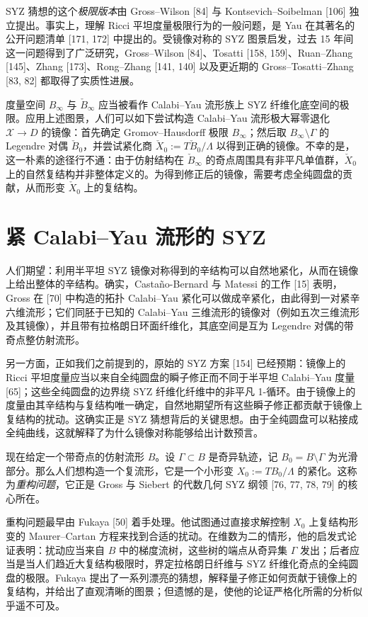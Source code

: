 SYZ 猜想的这个\emph{极限版本}由 Gross--Wilson [84] 与 Kontsevich--Soibelman [106] 独立提出。事实上，理解 Ricci 平坦度量极限行为的一般问题，是 Yau 在其著名的公开问题清单 [171, 172] 中提出的。受镜像对称的 SYZ 图景启发，过去 15 年间这一问题得到了广泛研究，Gross--Wilson [84]、Tosatti [158, 159]、Ruan--Zhang [145]、Zhang [173]、Rong--Zhang [141, 140] 以及更近期的 Gross--Tosatti--Zhang [83, 82] 都取得了实质性进展。

度量空间 $B_\infty$ 与 $\check B_\infty$ 应当被看作 Calabi--Yau 流形族上 SYZ 纤维化底空间的极限。应用上述图景，人们可以如下尝试构造 Calabi--Yau 流形极大幂零退化 $\mathcal{X} \to D$ 的镜像：首先确定 Gromov--Hausdorff 极限 $B_\infty$；然后取 $B_\infty \setminus \Gamma$ 的 Legendre 对偶 $\check B_0$，并尝试紧化商 $\check X_0 := T\check B_0/\Lambda$ 以得到正确的镜像。不幸的是，这一朴素的途径行不通：由于仿射结构在 $\check B_\infty$ 的奇点周围具有非平凡单值群，$\check X_0$ 上的自然复结构并非整体定义的。为得到修正后的镜像，需要考虑全纯圆盘的贡献，从而形变 $\check X_0$ 上的复结构。

\section{紧 Calabi--Yau 流形的 SYZ}
人们期望：利用半平坦 SYZ 镜像对称得到的辛结构可以自然地紧化，从而在镜像上给出整体的辛结构。确实，Casta\~no-Bernard 与 Matessi 的工作 [15] 表明，Gross 在 [70] 中构造的拓扑 Calabi--Yau 紧化可以做成辛紧化，由此得到一对紧辛六维流形；它们同胚于已知的 Calabi--Yau 三维流形的镜像对（例如五次三维流形及其镜像），并且带有拉格朗日环面纤维化，其底空间是互为 Legendre 对偶的带奇点整仿射流形。

另一方面，正如我们之前提到的，原始的 SYZ 方案 [154] 已经预期：镜像上的 Ricci 平坦度量应当以来自全纯圆盘的瞬子修正而不同于半平坦 Calabi--Yau 度量 [65]；这些全纯圆盘的边界绕 SYZ 纤维化纤维中的非平凡 1-循环。由于镜像上的度量由其辛结构与复结构唯一确定，自然地期望所有这些瞬子修正都贡献于镜像上复结构的扰动。这确实正是 SYZ 猜想背后的关键思想。由于全纯圆盘可以粘接成全纯曲线，这就解释了为什么镜像对称能够给出计数预言。

现在给定一个带奇点的仿射流形 $B$。设 $\Gamma \subset B$ 是奇异轨迹，记 $B_0 = B \setminus \Gamma$ 为光滑部分。那么人们想构造一个复流形，它是一个小形变 $X_0 := TB_0/\Lambda$ 的紧化。这称为\emph{重构问题}，它正是 Gross 与 Siebert 的代数几何 SYZ 纲领 [76, 77, 78, 79] 的核心所在。

重构问题最早由 Fukaya [50] 着手处理。他试图通过直接求解控制 $X_0$ 上复结构形变的 Maurer--Cartan 方程来找到合适的扰动。在维数为二的情形，他的启发式论证表明：扰动应当来自 $B$ 中的梯度流树，这些树的端点从奇异集 $\Gamma$ 发出；后者应当是当人们趋近大复结构极限时，界定拉格朗日纤维与 SYZ 纤维化奇点的全纯圆盘的极限。Fukaya 提出了一系列漂亮的猜想，解释量子修正如何贡献于镜像上的复结构，并给出了直观清晰的图景；但遗憾的是，使他的论证严格化所需的分析似乎遥不可及。

